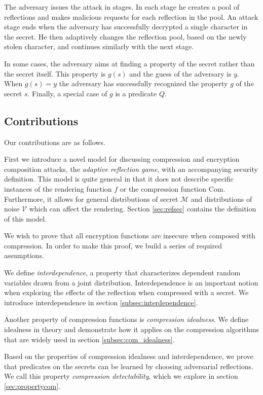 \documentclass[conference, letterpaper, 10pt]{IEEEtran}
\begin{document}
The adversary issues the attack in stages. In each stage he creates a pool of
reflections and makes malicious requests for each reflection in the pool. An
attack stage ends when the adversary has successfully decrypted a single
character in the secret. He then adaptively changes the reflection pool, based
on the newly stolen character, and continues similarly with the next stage.

In some cases, the adversary aims at finding a property of the secret rather
than the secret itself. This property is $g(s)$ and the guess of the adversary
is $y$. When $g(s) = y$ the adversary has successfully recognized the property
$g$ of the secret $s$. Finally, a special case of $g$ is a predicate $Q$.

\subsection{Contributions}
Our contributions are as follows.

First we introduce a novel model for discussing compression and encryption
composition attacks, the \textit{adaptive reflection game}, with an accompanying
security definition. This model is quite general in that it does not describe
specific instances of the rendering function $f$ or the compression function
$\textrm{Com}$. Furthermore, it allows for general distributions of secret $\mathcal{M}$
and distributions of noise $\mathcal{V}$ which can affect the rendering. Section
\ref{sec:refsec} contains the definition of this model.

We wish to prove that all encryption functions are insecure when composed with
compression. In order to make this proof, we build a series of required
assumptions.

We define \textit{interdependence}, a property that characterizes dependent
random variables drawn from a joint distribution. Interdependence is an
important notion when exploring the effects of the reflection when compressed
with a secret. We introduce interdependence in section
\ref{subsec:interdependence}.

Another property of compression functions is \textit{compression idealness}. We
define idealness in theory and demonstrate how it applies on the compression
algorithms that are widely used in section \ref{subsec:com_idealness}.

Based on the properties of compression idealness and interdependence, we prove
that predicates on the secrets can be learned by choosing adversarial
reflections. We call this property \textit{compression detectability}, which we
explore in section \ref{sec:propertycom}.
\end{document}
